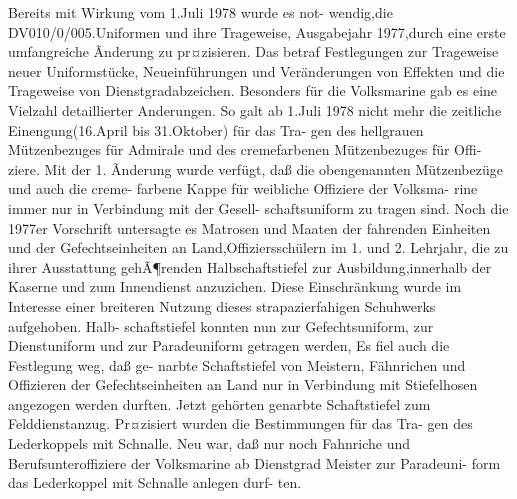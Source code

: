 

Bereits mit Wirkung vom 1.Juli 1978 wurde es not-
wendig,die DV010/0/005.Uniformen und ihre
Trageweise, Ausgabejahr 1977,durch eine erste
umfangreiche Ãnderung zu pr¤zisieren. Das betraf
Festlegungen zur Trageweise neuer Uniformstücke,
Neueinführungen und Veränderungen von Effekten und die Trageweise von Dienstgradabzeichen.
Besonders für die Volksmarine gab es eine Vielzahl
detaillierter Anderungen.
So galt ab 1.Juli 1978 nicht mehr die zeitliche
Einengung(16.April bis 31.Oktober) für das Tra-
gen des hellgrauen Mützenbezuges für Admirale
und des cremefarbenen Mützenbezuges für Offi-
ziere. Mit der 1. Ãnderung wurde verfügt, daß die
obengenannten Mützenbezüge und auch die creme-
farbene Kappe für weibliche Offiziere der Volksma-
rine immer nur in Verbindung mit der Gesell-
schaftsuniform zu tragen sind. Noch die 1977er
Vorschrift untersagte es Matrosen und Maaten der
fahrenden Einheiten und der Gefechtseinheiten an
Land,Offiziersschülern im 1. und 2. Lehrjahr, die
zu ihrer Ausstattung gehÃ¶renden Halbschaftstiefel zur Ausbildung,innerhalb der Kaserne und zum
Innendienst anzuzichen. Diese Einschränkung
wurde im Interesse einer breiteren Nutzung dieses
strapazierfahigen Schuhwerks aufgehoben. Halb-
schaftstiefel konnten nun zur Gefechtsuniform, zur
Dienstuniform und zur Paradeuniform getragen
werden, Es fiel auch die Festlegung weg, daß ge-
narbte Schaftstiefel von Meistern, Fähnrichen und
Offizieren der Gefechtseinheiten an Land nur in
Verbindung mit Stiefelhosen angezogen werden
durften. Jetzt gehörten genarbte Schaftstiefel zum
Felddienstanzug.
Pr¤zisiert wurden die Bestimmungen für das Tra-
gen des Lederkoppels mit Schnalle. Neu war, daß
nur noch Fahnriche und Berufsunteroffiziere der
Volksmarine ab Dienstgrad Meister zur Paradeuni-
form das Lederkoppel mit Schnalle anlegen durf-
ten.

